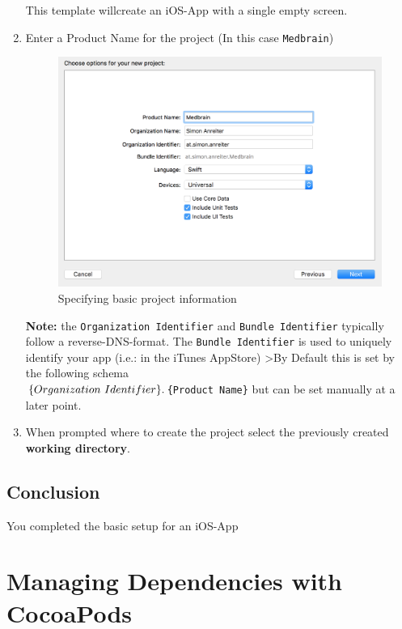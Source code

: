 \documentclass{article}
\begin{document}
\begin{enumerate}
  This template willcreate an iOS-App with a single empty screen.

\item
  Enter a Product Name for the project (In this case \texttt{Medbrain})

  \begin{figure}[H]
  \centering
  \includegraphics[width=\linewidth]{resources/step1/step_1_3.png}
  \caption{Specifying basic project information}
  \label{fig:basic_product_information}
  \end{figure}

  \textbf{Note:} the \texttt{Organization\ Identifier} and
  \texttt{Bundle\ Identifier} typically follow a reverse-DNS-format.
  The \texttt{Bundle\ Identifier} is used to uniquely
  identify your app (i.e.: in the iTunes AppStore) \textgreater{}By
  Default this is set by the following schema
  \texttt{\\$\{Organization\ Identifier\}.\\$\{Product\ Name\}} but can be
  set manually at a later point.
\item
  When prompted where to create the project select the previously
  created \textbf{working directory}.
\end{enumerate}

\subsection{Conclusion}\label{step1:conclusion}

You completed the basic setup for an iOS-App


\section{Managing Dependencies with
CocoaPods\cite{cocoapods}}\label{step2}
\end{document}

